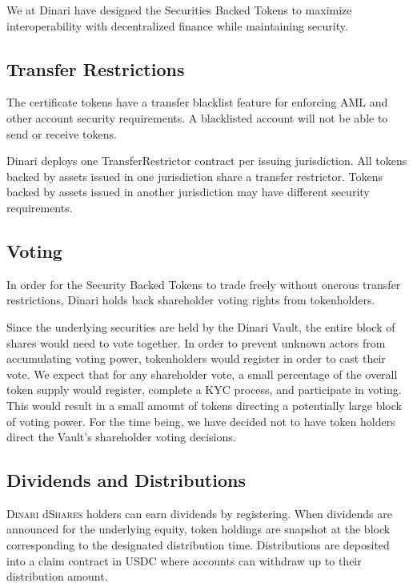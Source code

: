 \documentclass[sigconf,nonacm,prologue,table]{acmart}
\newcommand{\dshares}{\textsc{Dinari} d\textsc{Shares} }
\begin{document}
We at Dinari have designed the Securities Backed Tokens to maximize interoperability with decentralized finance while maintaining security.

\subsection{Transfer Restrictions}

The certificate tokens have a transfer blacklist feature for enforcing AML and other account security requirements. A blacklisted account will not be able to send or receive tokens.

Dinari deploys one TransferRestrictor contract per issuing jurisdiction. All tokens backed by assets issued in one jurisdiction share a transfer restrictor. Tokens backed by assets issued in another jurisdiction may have different security requirements.

\subsection{Voting}

In order for the Security Backed Tokens to trade freely without onerous transfer restrictions, Dinari holds back shareholder voting rights from tokenholders.

Since the underlying securities are held by the Dinari Vault, the entire block of shares would need to vote together. In order to prevent unknown actors from accumulating voting power, tokenholders would register in order to cast their vote. We expect that for any shareholder vote, a small percentage of the overall token supply would register, complete a KYC process, and participate in voting. This would result in a small amount of tokens directing a potentially large block of voting power. For the time being, we have decided not to have token holders direct the Vault’s shareholder voting decisions.

\subsection{Dividends and Distributions}

\dshares holders can earn dividends by registering. When dividends are announced for the underlying equity, token holdings are snapshot at the block corresponding to the designated distribution time. Distributions are deposited into a claim contract in USDC where accounts can withdraw up to their distribution amount.
\end{document}
